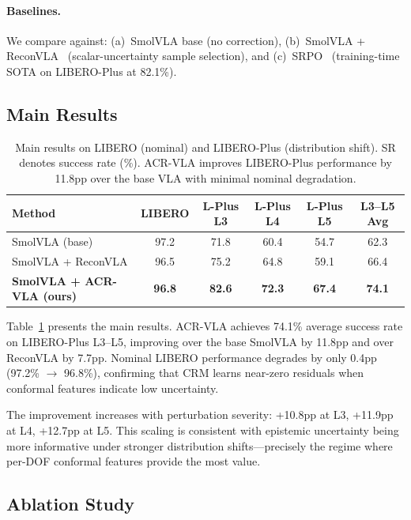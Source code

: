 \documentclass[10pt,letterpaper]{article}
\newcommand{\ours}{ACR-VLA}
\newcommand{\crm}{CRM}
\begin{document}
\paragraph{Baselines.}
We compare against: (a)~SmolVLA base (no correction), (b)~SmolVLA + ReconVLA~\cite{reconvla} (scalar-uncertainty sample selection), and (c)~SRPO~\cite{SRPO} (training-time SOTA on LIBERO-Plus at 82.1\%).

\subsection{Main Results}
\label{sec:main_results}

\begin{table}[t]
\centering
\caption{Main results on LIBERO (nominal) and LIBERO-Plus (distribution shift). SR denotes success rate (\%). \ours{} improves LIBERO-Plus performance by 11.8pp over the base VLA with minimal nominal degradation.}
\label{tab:main}
\begin{tabular}{lccccc}
\toprule
\textbf{Method} & \textbf{LIBERO} & \textbf{L-Plus L3} & \textbf{L-Plus L4} & \textbf{L-Plus L5} & \textbf{L3--L5 Avg} \\
\midrule
SmolVLA (base) & 97.2 & 71.8 & 60.4 & 54.7 & 62.3 \\
SmolVLA + ReconVLA & 96.5 & 75.2 & 64.8 & 59.1 & 66.4 \\
\textbf{SmolVLA + \ours{} (ours)} & \textbf{96.8} & \textbf{82.6} & \textbf{72.3} & \textbf{67.4} & \textbf{74.1} \\
\bottomrule
\end{tabular}
\end{table}

Table~\ref{tab:main} presents the main results.
\ours{} achieves 74.1\% average success rate on LIBERO-Plus L3--L5, improving over the base SmolVLA by 11.8pp and over ReconVLA by 7.7pp.
Nominal LIBERO performance degrades by only 0.4pp (97.2\% $\to$ 96.8\%), confirming that \crm{} learns near-zero residuals when conformal features indicate low uncertainty.

The improvement increases with perturbation severity: +10.8pp at L3, +11.9pp at L4, +12.7pp at L5.
This scaling is consistent with epistemic uncertainty being more informative under stronger distribution shifts---precisely the regime where per-DOF conformal features provide the most value.

\subsection{Ablation Study}
\label{sec:ablations}
\end{document}
